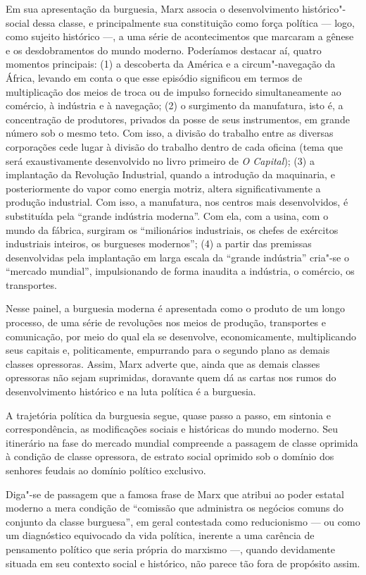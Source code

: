 Em sua apresentação da burguesia, Marx associa o desenvolvimento
histórico"-social dessa classe, e principalmente sua constituição como
força política --- logo, como sujeito histórico ---, a uma série de
acontecimentos que marcaram a gênese e os desdobramentos do mundo
moderno. Poderíamos destacar aí, quatro momentos principais: (1) a
descoberta da América e a circum"-navegação da África, levando em conta o
que esse episódio significou em termos de multiplicação dos meios de
troca ou de impulso fornecido simultaneamente ao comércio, à indústria
e à navegação; (2) o surgimento da manufatura, isto é, a concentração
de produtores, privados da posse de seus instrumentos, em grande número
sob o mesmo teto. Com isso, a divisão do trabalho entre as diversas
corporações cede lugar à divisão do trabalho dentro de cada oficina
(tema que será exaustivamente desenvolvido no livro primeiro de
\textit{O Capital}); (3) a implantação da Revolução Industrial, quando
a introdução da maquinaria, e posteriormente do vapor como energia
motriz, altera significativamente a produção industrial. Com isso, a
manufatura, nos centros mais desenvolvidos, é substituída pela “grande
indústria moderna”. Com ela, com a usina, com o mundo da fábrica,
surgiram os “milionários industriais, os chefes de exércitos
industriais inteiros, os burgueses modernos”; (4) a partir das
premissas desenvolvidas pela implantação em larga escala da “grande
indústria” cria"-se o “mercado mundial”, impulsionando de forma
inaudita a indústria, o comércio, os transportes.

Nesse painel, a burguesia moderna é apresentada como o produto de um
longo processo, de uma série de revoluções nos meios de produção,
transportes e comunicação, por meio do qual ela se desenvolve,
economicamente, multiplicando seus capitais e, politicamente,
empurrando para o segundo plano as demais classes opressoras. Assim,
Marx adverte que, ainda que as demais classes opressoras não sejam
suprimidas, doravante quem dá as cartas nos rumos do desenvolvimento
histórico e na luta política é a burguesia.

A trajetória política da burguesia segue, quase passo a passo, em
sintonia e correspondência, as modificações sociais e históricas do
mundo moderno. Seu itinerário na fase do mercado mundial compreende a passagem de classe oprimida
à condição de classe opressora, de estrato social oprimido sob o
domínio dos senhores feudais ao domínio político exclusivo.

Diga"-se de passagem que a famosa frase de Marx que atribui ao poder
estatal moderno a mera condição de “comissão que administra os negócios
comuns do conjunto da classe burguesa”, em geral contestada como
reducionismo --- ou como um diagnóstico equivocado da vida política,
inerente a uma carência de pensamento político que seria própria do
marxismo ---, quando devidamente situada em seu contexto social e
histórico, não parece tão fora de propósito assim.

